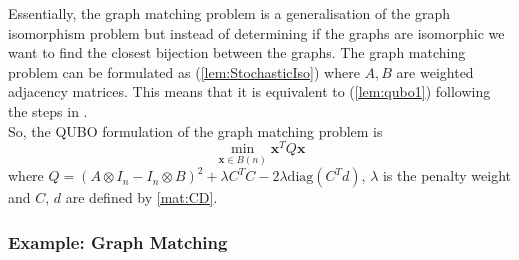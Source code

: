 \documentclass{article}
\begin{document}
\noindent Essentially, the graph matching problem is a generalisation of the graph isomorphism problem but instead of determining if the graphs are isomorphic we want to find the closest bijection between the graphs.
The graph matching problem can be formulated as (\ref{lem:StochasticIso}) where \(A,B\) are weighted adjacency matrices. This means that it is equivalent to (\ref{lem:qubo1}) following the steps in \cite{klus2023continuous}.\\

\noindent So, the QUBO formulation of the graph matching problem is
\begin{equation*}
	\min_{\mathbf{x} \in B(n)} \mathbf{x}^T Q \mathbf{x}
\end{equation*}
where \(Q = (A \otimes I_n - I_n \otimes B)^2 + \lambda C^T C - 2\lambda\text{diag}(C^T d)\), \(\lambda\) is the penalty weight and \(C\), \(d\) are defined by \ref{mat:CD}.\\

\subsubsection{Example: Graph Matching}
\end{document}
